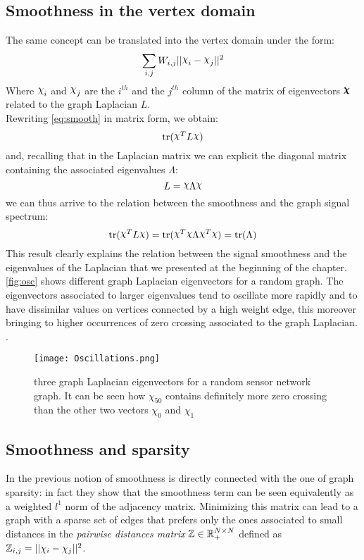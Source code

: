 \subsection{Smoothness in the vertex domain}
The same concept can be translated into the vertex domain under the form:
\begin{equation}
\sum_{i,j}W_{i,j}||\rchi_i - \rchi_j||^2
\label{eq:smoothVertex}
\end{equation}
Where $\rchi_i$ and $\rchi_j$ are the $i^{th}$ and the $j^{th}$ column of the matrix of eigenvectors $\pmb{\rchi}$ related to the graph Laplacian $L$.\\
Rewriting \autoref{eq:smooth} in matrix form, we obtain\cite{Kalofolias2016}:
\begin{equation}
\tr(\rchi^T L \rchi)
\label{eq:smoothMatrix}
\end{equation}
and, recalling that in the Laplacian matrix we can explicit the diagonal matrix containing the associated eigenvalues $\Lambda$:
\begin{equation}
L = \rchi \Lambda \rchi
\label{eq:diag}
\end{equation}
we can thus arrive to the relation between the smoothness and the graph signal spectrum:
\begin{equation}
\tr(\rchi^T L \rchi) = \tr(\rchi^T \rchi \Lambda \rchi^T \rchi) = \tr(\Lambda)
\end{equation}
This result clearly explains the relation between the signal smoothness and the eigenvalues of the Laplacian that we presented at the beginning of the chapter.\autoref{fig:osc} shows different graph Laplacian eigenvectors for a random graph. The eigenvectors associated to larger eigenvalues tend to oscillate more rapidly and to have dissimilar values on vertices connected by a high weight edge, this moreover bringing to higher occurrences of zero crossing associated to the graph Laplacian. \cite{Shuman2013}.

\begin{figure}[tb]
\centering
\texttt{[image: Oscillations.png]}
\caption{three graph Laplacian eigenvectors for a random sensor network graph. It can be seen how $\chi_{50}$ contains definitely more zero crossing than the other two vectors $\chi_0$ and $\chi_1$}
\label{fig:osc}
\end{figure}

\subsection{Smoothness and sparsity}
In \cite{Kalofolias2016} the previous notion of smoothness is directly connected with the one of graph sparsity: in fact they show that the smoothness term can be seen equivalently as a weighted $l^1$ norm of the adjacency matrix. Minimizing this matrix can lead to a graph with a sparse set of edges that prefers only the ones associated to small distances in the \textit{pairwise distances matrix} $\mathbb{Z} \in \mathbb{R}^{N\times N}_+$ defined as $\mathbb{Z}_{i,j} = ||\chi_i - \chi_j||^2$.

